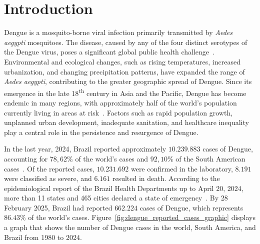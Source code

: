 \chapter{Introduction}\label{chp:introduction}

Dengue is a mosquito-borne viral infection primarily transmitted by
\textit{Aedes aegypti} mosquitoes. The disease, caused by any of the four
distinct serotypes of the Dengue virus, poses a significant global public health
challenge~\citep{shepard:2016}. Environmental and ecological changes, such as
rising temperatures, increased urbanization, and changing precipitation
patterns, have expanded the range of \textit{Aedes aegypti}, contributing to the
greater geographic spread of Dengue. Since its emergence in the late
18\textsuperscript{th} century in Asia and the Pacific, Dengue has become
endemic in many regions, with approximately half of the world's population
currently living in areas at risk~\citep{fares:2015,negreiros-2020}. Factors
such as rapid population growth, unplanned urban development, inadequate
sanitation, and healthcare inequality play a central role in the persistence and
resurgence of Dengue.

In the last year, 2024, Brazil reported approximately $10.239.883$ cases of
Dengue, accounting for $78,62\%$ of the world's cases and $92,10\%$ of the South
American cases~\citep{BardachEtal2019}. Of the reported cases, $10.231.692$ were
confirmed in the laboratory, $8.191$ were classified as severe, and $6.161$
resulted in death. According to the epidemiological report of the Brazil Health
Departments up to April 20, 2024, more than 11 states and 465 cities declared a
state of emergency~\citep{health-dp-1}. By 28 February 2025, Brazil had reported
$662.224$ cases of Dengue, which represents $86.43\%$ of the world's cases.
Figure~\ref{fig:dengue_reported_cases_graphic} displays a graph that shows
the number of Dengue cases in the world, South America, and Brazil from 1980 to
2024.


